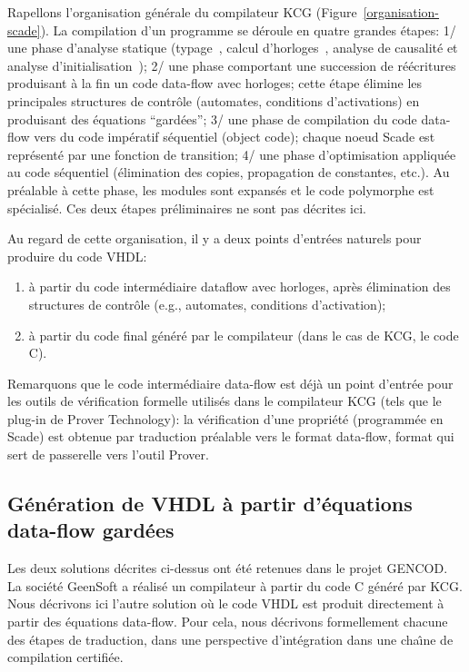 \documentclass[a4paper]{article}
\newcommand{\scade}{{\sc Scade}}
\begin{document}
Rapellons l'organisation g\'en\'erale du compilateur KCG
(Figure~\ref{organisation-scade}).  La compilation d'un programme se
d\'eroule en quatre grandes \'etapes: 1/ une phase d'analyse statique
(typage~\cite{lucy:emsoft03}, calcul d'horloges~\cite{lucy:emsoft04},
analyse de causalit\'e et analyse d'initialisation~\cite{lucy:sttt04});
2/ une phase comportant une succession de r\'e\'ecritures produisant \`a la
fin un code data-flow avec horloges; cette \'etape \'elimine les
principales structures de contr\^ole (automates, conditions
d'activations) en produisant des \'equations ``gard\'ees''; 3/ une phase
de compilation du code data-flow vers du code imp\'eratif s\'equentiel
(object code); chaque noeud \scade{} est repr\'esent\'e par une fonction
de transition; 4/ une phase d'optimisation appliqu\'ee au code
s\'equentiel (\'elimination des copies, propagation de constantes,
etc.). Au pr\'ealable \`a cette phase, les modules sont expans\'es et le
code polymorphe est sp\'ecialis\'e. Ces deux \'etapes pr\'eliminaires ne sont
pas d\'ecrites ici.

Au regard de cette organisation, il y a deux points d'entr\'ees naturels
pour produire du code VHDL:
\begin{enumerate}
\item \`a partir du code interm\'ediaire dataflow avec horloges, apr\`es
  \'elimination des structures de contr\^ole (e.g., automates, conditions
  d'activation);
\item
\`a partir du code final g\'en\'er\'e par le compilateur (dans le cas de KCG, le
code C).
\end{enumerate}

Remarquons que le code interm\'ediaire data-flow est d\'ej\`a un point d'entr\'ee pour les
outils de v\'erification formelle utilis\'es dans le compilateur KCG (tels que
le plug-in de Prover Technology): la v\'erification d'une propri\'et\'e (programm\'ee
en \scade) est obtenue par traduction pr\'ealable vers le format data-flow,
format qui sert de passerelle vers l'outil Prover.

\subsection{G\'en\'eration de VHDL \`a partir d'\'equations data-flow gard\'ees}
Les deux solutions d\'ecrites ci-dessus ont \'et\'e retenues dans le projet
GENCOD. La soci\'et\'e GeenSoft a r\'ealis\'e un compilateur \`a partir du code
C g\'en\'er\'e par KCG. Nous d\'ecrivons ici l'autre solution o\`u le code VHDL
est produit directement \`a partir des \'equations data-flow. Pour cela, nous
d\'ecrivons formellement chacune des \'etapes de traduction, dans une perspective
d'int\'egration dans une cha\^{\i}ne de compilation certifi\'ee.
\end{document}
